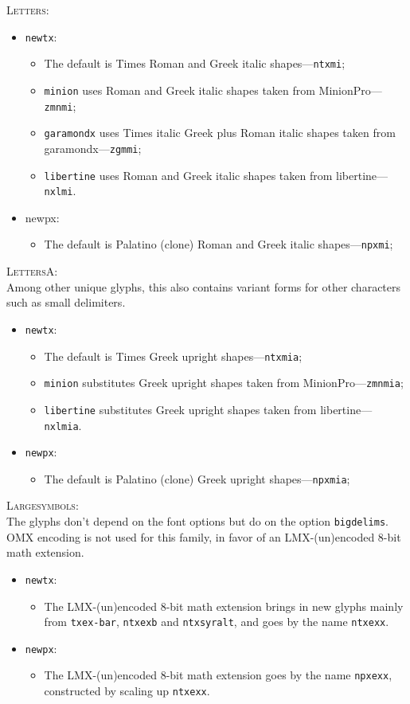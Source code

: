 \documentclass[11pt]{article}
\begin{document}
\textsc{Letters}:
\begin{itemize}
\item {\tt newtx}:
\begin{itemize}
\item The default is Times Roman and Greek italic shapes---{\tt ntxmi};
\item {\tt minion} uses Roman and Greek italic shapes taken from MinionPro---{\tt zmnmi};
\item {\tt garamondx} uses Times italic Greek plus Roman italic shapes taken from garamondx---{\tt zgmmi};
\item {\tt libertine} uses Roman and Greek italic shapes taken from libertine---{\tt nxlmi}.
\end{itemize}
\item {newpx}:
\begin{itemize}
\item The default is Palatino (clone)  Roman and Greek italic shapes---{\tt npxmi};
\end{itemize}
\end{itemize}

\textsc{LettersA}:\\
Among other unique glyphs, this also contains variant forms for other characters such as small delimiters.
\begin{itemize}
\item {\tt newtx}:
\begin{itemize}
\item The default is Times Greek upright shapes---{\tt ntxmia};
\item {\tt minion} substitutes Greek upright shapes taken from MinionPro---{\tt zmnmia};
\item {\tt libertine} substitutes Greek upright shapes taken from libertine---{\tt nxlmia}.
\end{itemize}
\item {\tt newpx}:
\begin{itemize}
\item The default is Palatino (clone)  Greek upright shapes---{\tt npxmia};
\end{itemize}
\end{itemize}

\textsc{Largesymbols}:\\
The glyphs don't depend on the font options but do on the option {\tt bigdelims}. OMX encoding is not used for this family, in favor of an LMX-(un)encoded 8-bit math extension.
\begin{itemize}

\item {\tt newtx}:
\begin{itemize}
\item The LMX-(un)encoded 8-bit math extension brings in new glyphs mainly from   {\tt txex-bar}, {\tt ntxexb} and {\tt ntxsyralt}, and goes by the name {\tt ntxexx}.
\end{itemize}
\item {\tt newpx}:
\begin{itemize}
\item The LMX-(un)encoded 8-bit math extension  goes by the name {\tt npxexx}, constructed by scaling up {\tt ntxexx}.
\end{itemize}
\end{itemize}
\end{document}
